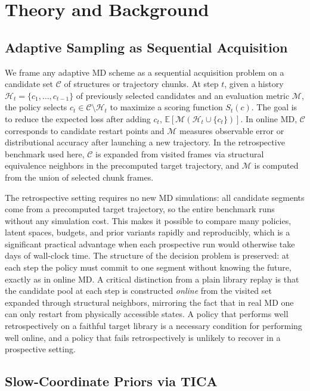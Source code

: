 \section{Theory and Background}

\subsection{Adaptive Sampling as Sequential Acquisition}

We frame any adaptive MD scheme as a sequential acquisition problem on a candidate set $\mathcal{C}$ of structures or trajectory chunks.
At step $t$, given a history $\mathcal{H}_t = \{c_1,\ldots,c_{t-1}\}$ of previously selected candidates and an evaluation metric $\mathcal{M}$, the policy selects $c_t \in \mathcal{C}\setminus\mathcal{H}_t$ to maximize a scoring function $S_t(c)$.
The goal is to reduce the expected loss after adding $c_t$, $\mathbb{E}[\mathcal{M}(\mathcal{H}_t \cup \{c_t\})]$.
In online MD, $\mathcal{C}$ corresponds to candidate restart points and $\mathcal{M}$ measures observable error or distributional accuracy after launching a new trajectory.
In the retrospective benchmark used here, $\mathcal{C}$ is expanded from visited frames via structural equivalence neighbors in the precomputed target trajectory, and $\mathcal{M}$ is computed from the union of selected chunk frames.

The retrospective setting requires no new MD simulations: all candidate segments come from a precomputed target trajectory, so the entire benchmark runs without any simulation cost.
This makes it possible to compare many policies, latent spaces, budgets, and prior variants rapidly and reproducibly, which is a significant practical advantage when each prospective run would otherwise take days of wall-clock time.
The structure of the decision problem is preserved: at each step the policy must commit to one segment without knowing the future, exactly as in online MD.
A critical distinction from a plain library replay is that the candidate pool at each step is constructed \emph{online} from the visited set expanded through structural neighbors, mirroring the fact that in real MD one can only restart from physically accessible states.
A policy that performs well retrospectively on a faithful target library is a necessary condition for performing well online, and a policy that fails retrospectively is unlikely to recover in a prospective setting.

\subsection{Slow-Coordinate Priors via TICA}

